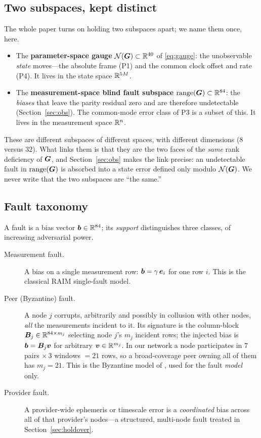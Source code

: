 \subsection{Two subspaces, kept distinct}
\label{sec:twosubspaces}

The whole paper turns on holding two subspaces apart; we name them once, here.
\begin{itemize}
  \item The \textbf{parameter-space gauge}
  $\mathcal{N}(\bm{G})\subset\mathbb{R}^{40}$ of \eqref{eq:gauge}: the unobservable \emph{state} moves---the
  absolute frame (P1) and the common clock offset and rate (P4). It lives in the state space
  $\mathbb{R}^{5M}$.
  \item The \textbf{measurement-space blind fault subspace}
  $\operatorname{range}(\bm{G})\subset\mathbb{R}^{84}$: the \emph{biases} that leave the parity residual zero and are
  therefore undetectable (Section~\ref{sec:obs}). The common-mode error class of P3
  \citep{baweja2026commonmode} is a subset of this. It lives in the measurement space
  $\mathbb{R}^{n}$.
\end{itemize}
These are different subspaces of different spaces, with different dimensions ($8$ versus
$32$). What links them is that they are the two faces of the \emph{same} rank deficiency of
$\bm{G}$, and Section~\ref{sec:obs} makes the link precise: an undetectable fault in
$\operatorname{range}(\bm{G})$ is absorbed into a state error defined only modulo $\mathcal{N}(\bm{G})$. We never
write that the two subspaces are ``the same.''

\subsection{Fault taxonomy}
\label{sec:taxonomy}

A fault is a bias vector $\bm{b}\in\mathbb{R}^{84}$; its \emph{support} distinguishes three classes,
of increasing adversarial power.
\begin{description}
  \item[Measurement fault.] A bias on a single measurement row: $\bm{b}=\gamma\,\bm e_i$ for
  one row $i$. This is the classical RAIM single-fault model.
  \item[Peer (Byzantine) fault.] A node $j$ corrupts, arbitrarily and possibly in collusion
  with other nodes, \emph{all} the measurements incident to it. Its signature is the
  column-block $\bm{B}_j\in\mathbb{R}^{84\times m_j}$ selecting node $j$'s $m_j$ incident rows; the
  injected bias is $\bm{b}=\bm{B}_j\bm v$ for arbitrary $\bm v\in\mathbb{R}^{m_j}$. In our network a
  node participates in $7$ pairs $\times\,3$ windows $=21$ rows, so a broad-coverage peer
  owning all of them has $m_j=21$. This is the Byzantine model of \citep{lamport1982},
  used for the fault \emph{model} only.
  \item[Provider fault.] A provider-wide ephemeris or timescale error is a \emph{coordinated}
  bias across all of that provider's nodes---a structured, multi-node fault treated in
  Section~\ref{sec:holdover}.
\end{description}

